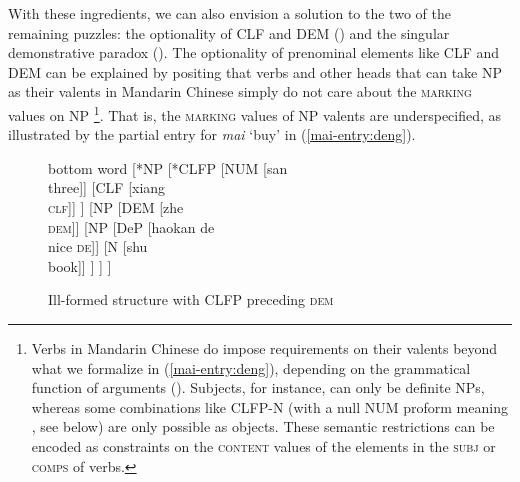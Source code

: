 \documentclass[output=paper,colorlinks,citecolor=brown]{langscibook}
\begin{document}
With these ingredients, we can also envision a solution to the two of the remaining puzzles: the optionality of  CLF and DEM () and the singular demonstrative paradox (). The optionality of prenominal elements like CLF and DEM can be explained  by positing that verbs and other heads that can take NP as their valents in Mandarin Chinese simply do not care about the \textsc{marking} values on NP \footnote{Verbs in Mandarin Chinese do impose requirements on their valents beyond what we formalize in (\ref{mai-entry:deng}), depending on the grammatical function of arguments (\citealt{Huang&Co09a}). Subjects, for instance,  can only be definite NPs, whereas some combinations like  CLFP-N (with a null NUM proform meaning , see below) are only possible as objects. These semantic restrictions can be encoded as constraints on the \textsc{content} values of the elements in the \textsc{subj} or \textsc{comps} of verbs.}. That is, the \textsc{marking} values of NP valents are underspecified, as illustrated by the partial entry for \textit{mai} `buy' in (\ref{mai-entry:deng}).

\begin{figure}
  \centering
		\begin{forest}
			bottom word
	[*NP
			[*CLFP
				[NUM [san \\ three]]
			[CLF [xiang \\ \textsc{clf}]]
			]
		[NP
		[DEM [zhe \\ \textsc{dem}]] 	
			[NP
				[DeP [haokan de\\ nice \textsc{de}]]
				[N]
			]
		]
	]
		\end{forest}
  \caption{Ill-formed structure with CLFP preceding \textsc{dem}}
  \label{clp-dem:deng}
\end{figure}


\ea 
        \label{mai-entry:deng}
\z
\end{document}
